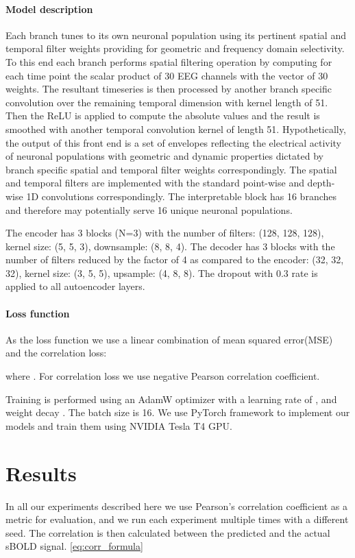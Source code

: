 \documentclass{article}
\begin{document}
\paragraph{Model description }

Each branch tunes to its own neuronal population using its pertinent spatial and temporal filter weights providing for geometric and frequency domain selectivity. To this end each branch performs spatial filtering operation by computing for each time point the scalar product of 30 EEG channels with the vector of 30 weights. The resultant timeseries is then processed by another branch specific convolution over the remaining temporal dimension with kernel length of 51. Then the ReLU is applied to compute the absolute values and the result is smoothed with another temporal convolution kernel of length 51. Hypothetically, the output of this front end is a set of envelopes reflecting the electrical activity of neuronal populations with geometric and dynamic properties dictated by branch specific spatial and temporal filter weights correspondingly. The spatial and temporal filters are implemented with the standard point-wise and depth-wise 1D convolutions correspondingly. The interpretable block has 16 branches and therefore may potentially serve 16 unique neuronal populations.

The encoder has 3 blocks (N=3) with the number of filters: (128, 128, 128), kernel size: (5, 5, 3), downsample: (8, 8, 4). The decoder has 3 blocks with the number of filters reduced by the factor of 4  as compared to the encoder: (32, 32, 32), kernel size: (3, 5, 5), upsample: (4, 8, 8). The dropout with 0.3 rate is applied to all autoencoder layers.

\paragraph{Loss function}

As the loss function we use a  linear combination of mean squared error(MSE) and the correlation loss:

where . For correlation loss we use negative Pearson correlation coefficient.

Training is performed using an AdamW \cite{adamw} optimizer with a learning rate of ,  and weight decay . The batch size is  16. We use PyTorch framework to implement our models and train them using NVIDIA Tesla T4 GPU.

\section{Results}
\label{section:result}
In all our experiments described here we use Pearson's correlation coefficient as a metric for evaluation, and we run each experiment multiple times with a different seed. The correlation is then calculated between the predicted and the actual sBOLD signal. \ref{eq:corr_formula}
\end{document}
